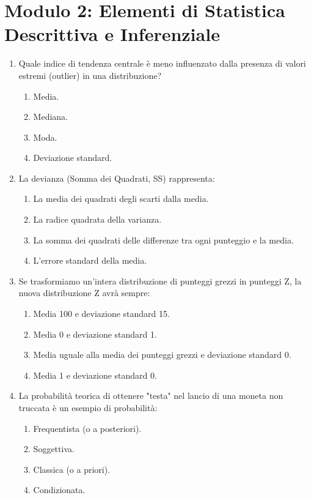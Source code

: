 \documentclass[12pt, a4paper]{article}
\begin{document}
\section*{Modulo 2: Elementi di Statistica Descrittiva e Inferenziale}
\begin{enumerate}[resume]
    \item Quale indice di tendenza centrale è meno influenzato dalla presenza di valori estremi (outlier) in una distribuzione?
    \begin{enumerate}
        \item Media.
        \item Mediana.
        \item Moda.
        \item Deviazione standard.
    \end{enumerate}
    \vspace{0.3cm}

    \item La devianza (Somma dei Quadrati, SS) rappresenta:
    \begin{enumerate}
        \item La media dei quadrati degli scarti dalla media.
        \item La radice quadrata della varianza.
        \item La somma dei quadrati delle differenze tra ogni punteggio e la media.
        \item L'errore standard della media.
    \end{enumerate}
    \vspace{0.3cm}

    \item Se trasformiamo un'intera distribuzione di punteggi grezzi in punteggi Z, la nuova distribuzione Z avrà sempre:
    \begin{enumerate}
        \item Media 100 e deviazione standard 15.
        \item Media 0 e deviazione standard 1.
        \item Media uguale alla media dei punteggi grezzi e deviazione standard 0.
        \item Media 1 e deviazione standard 0.
    \end{enumerate}
    \vspace{0.3cm}

    \item La probabilità teorica di ottenere "testa" nel lancio di una moneta non truccata è un esempio di probabilità:
    \begin{enumerate}
        \item Frequentista (o a posteriori).
        \item Soggettiva.
        \item Classica (o a priori).
        \item Condizionata.
    \end{enumerate}
    \vspace{0.3cm}


\end{enumerate}
\end{document}
